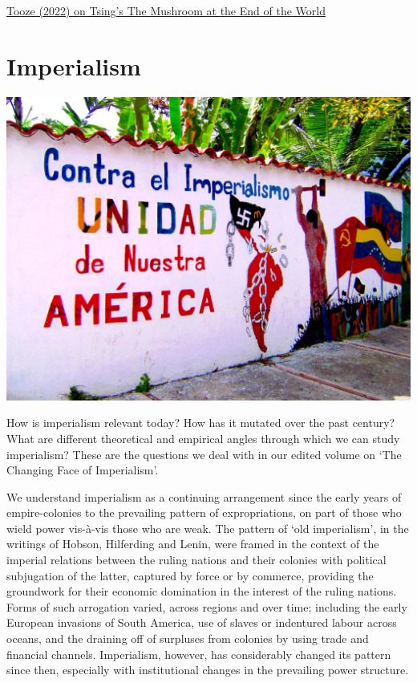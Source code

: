 \documentclass[
]{book}
\begin{document}
\href{https://adamtooze.substack.com/p/chartbook-67-in-the-middle-of-things}{Tooze (2022) on Tsing's The Mushroom at the End of the World}

\hypertarget{imperialism}{%
\chapter{Imperialism}\label{imperialism}}

\includegraphics{fig/imperialism_mural.png}

How is imperialism relevant today? How has it mutated over the past century? What are different theoretical and empirical angles through which we can study imperialism? These are the questions we deal with in our edited volume on `The Changing Face of Imperialism'.

We understand imperialism as a continuing arrangement since the early years of empire-colonies to the prevailing pattern of expropriations, on part of those who wield power vis-à-vis those who are weak. The pattern of `old imperialism', in the writings of Hobson, Hilferding and Lenin, were framed in the context of the imperial relations between the ruling nations and their colonies with political subjugation of the latter, captured by force or by commerce, providing the groundwork for their economic domination in the interest of the ruling nations. Forms of such arrogation varied, across regions and over time; including the early European invasions of South America, use of slaves or indentured labour across oceans, and the draining off of surpluses from colonies by using trade and financial channels. Imperialism, however, has considerably changed its pattern since then, especially with institutional changes in the prevailing power structure.
\end{document}
